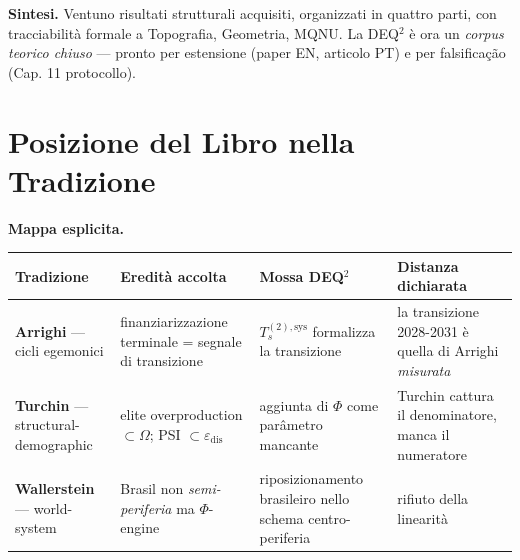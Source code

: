 \Hypoth{} \textbf{Sintesi.} Ventuno risultati strutturali acquisiti,
organizzati in quattro parti, con tracciabilità formale a Topografia,
Geometria, MQNU. La DEQ$^2$ è ora un \emph{corpus teorico chiuso} ---
pronto per estensione (paper EN, articolo PT) e per falsificação (Cap.
11 protocollo).



\section{Posizione del Libro nella
Tradizione}\label{posizione-del-libro-nella-tradizione}

\Hypoth{} \textbf{Mappa esplicita.}

{\def\LTcaptype{none} %
{\small\begin{longtable}[]{@{}
  >{\raggedright\arraybackslash}p{}
  >{\raggedright\arraybackslash}p{}
  >{\raggedright\arraybackslash}p{}
  >{\raggedright\arraybackslash}p{}@{}}
\toprule\noalign{}
\begin{minipage}[b]{\linewidth}\raggedright
Tradizione
\end{minipage} & \begin{minipage}[b]{\linewidth}\raggedright
Eredità accolta
\end{minipage} & \begin{minipage}[b]{\linewidth}\raggedright
Mossa DEQ$^2$
\end{minipage} & \begin{minipage}[b]{\linewidth}\raggedright
Distanza dichiarata
\end{minipage} \\
\midrule\noalign{}
\endhead
\bottomrule\noalign{}
\endlastfoot
\textbf{Arrighi} --- cicli egemonici & finanziarizzazione terminale =
segnale di transizione & \(T_s^{(2),\text{sys}}\) formalizza la
transizione & la transizione 2028-2031 è quella di Arrighi
\emph{misurata} \\
\textbf{Turchin} --- structural-demographic & elite overproduction
\(\subset \Omega\); PSI \(\subset \varepsilon_{\text{dis}}\) & aggiunta
di \(\Phi\) come parâmetro mancante & Turchin cattura il denominatore,
manca il numeratore \\
\textbf{Wallerstein} --- world-system & Brasil non
\emph{semi-periferia} ma \(\Phi\)-engine & riposizionamento brasileiro
nello schema centro-periferia & rifiuto della linearità

\end{longtable}}}
